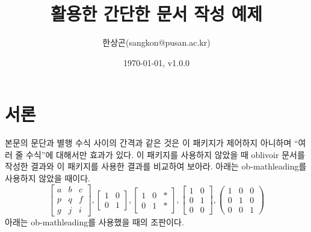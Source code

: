 \documentclass[a4paper,amsmath]{oblivoir}
\newcommand\pkg[1]{\textsf{#1}}
\begin{document}
\title{ 활용한 간단한 문서 작성 예제}
\author{한상곤(sangkon@pusan.ac.kr)}
\date{\today, v1.0.0}
\maketitle

\begin{abstract}
    \lipsum[2-3]
\end{abstract}

\tableofcontents*

\section{서론}

\blindtext

본문의 문단과 별행 수식 사이의 간격과 같은 것은 이 패키지가 제어하지 아니하며 ``여러 줄 수식''에 대해서만
효과가 있다. 이 패키지를 사용하지 않았을 때 \pkg{oblivoir} 문서를 작성한 결과와 이 패키지를 사용한 결과를 비교하여 보아라. 
아래는 \pkg{ob-mathleading}를 사용하지 않았을 때이다.
\[
    \begin{bmatrix} a & b & c \\ p & q & f \\ g & j & i \end{bmatrix},
    \begin{bmatrix} 1 & 0 \\ 0 & 1\end{bmatrix},
    \begin{bmatrix} 1 & 0 & \ast\! \\ 0 & 1 & \ast\! \end{bmatrix},
    \begin{bmatrix} 1 & 0 \\ 0 & 1 \\ 0 & 0 \end{bmatrix},
    \begin{pmatrix} 1 & 0 & 0 \\ 0 & 1 & 0 \\ 0 & 0 & 1 \end{pmatrix}
\]
아래는  \pkg{ob-mathleading}를 사용했을 때의 조판이다.
\end{document}
